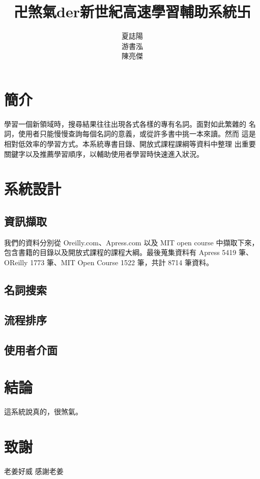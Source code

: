 \documentclass[twocolumn]{article}
\begin{document}
\title{卍煞氣der新世紀高速學習輔助系統卐}

\author{
\alignauthor 夏誌陽 \\
\alignauthor 游書泓 \\
\alignauthor 陳亮傑\\
\and
}
\date{}
\maketitle
\thispagestyle{empty}

\section{簡介}
學習一個新領域時，搜尋結果往往出現各式各樣的專有名詞。面對如此繁雜的
名詞，使用者只能慢慢查詢每個名詞的意義，或從許多書中挑一本來讀。然而
這是相對低效率的學習方式。本系統專書目錄、開放式課程課綱等資料中整理
出重要關鍵字以及推薦學習順序，以輔助使用者學習時快速進入狀況。

\section{系統設計}


\subsection{資訊擷取}
我們的資料分別從 Oreilly.com、Apress.com 以及 MIT open course 中擷取下來，
包含書籍的目錄以及開放式課程的課程大綱。最後蒐集資料有 Apress 5419 筆、
OReilly 1773 筆、MIT Open Course 1522 筆，共計 8714 筆資料。

\subsection{名詞搜索}


\subsection{流程排序}


\subsection{使用者介面}


\section{結論}
這系統說真的，很煞氣。

\section{致謝}
老姜好威 感謝老姜
\end{document}
